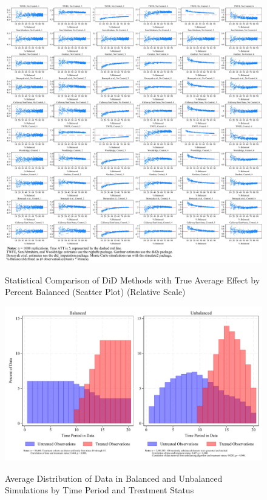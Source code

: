 \documentclass[12pt]{article}
\begin{document}
\begin{figure}
    \centering
    \caption{Statistical Comparison of DiD Methods with True Average Effect by Percent Balanced (Scatter Plot) (Relative Scale)}
    \includegraphics[width=6in]{Figures/Scatters by Percent Balanced Relative Scale.jpg}
    \label{fig:scatters-relative}
\end{figure}

\begin{figure}[H]
    \centering
    \caption{Average Distribution of Data in Balanced and Unbalanced Simulations by Time Period and Treatment Status}
    \includegraphics[width=6.5in]{Figures/Average Distribution of Data in Simulations by Treated.jpg}
    \label{fig:dist-treat}
\end{figure}
\end{document}
